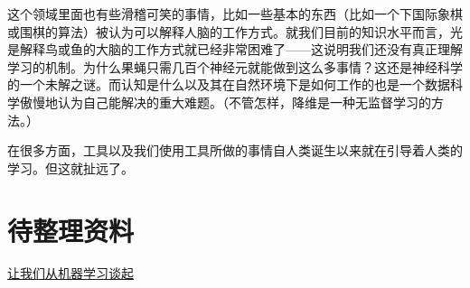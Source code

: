 \documentclass[10pt,a4paper]{ctexbook}
\begin{document}
这个领域里面也有些滑稽可笑的事情，比如一些基本的东西（比如一个下国际象棋或围棋的算法）被认为可以解释人脑的工作方式。就我们目前的知识水平而言，光是解释鸟或鱼的大脑的工作方式就已经非常困难了——这说明我们还没有真正理解学习的机制。为什么果蝇只需几百个神经元就能做到这么多事情？这还是神经科学的一个未解之谜。而认知是什么以及其在自然环境下是如何工作的也是一个数据科学傲慢地认为自己能解决的重大难题。（不管怎样，降维是一种无监督学习的方法。）

在很多方面，工具以及我们使用工具所做的事情自人类诞生以来就在引导着人类的学习。但这就扯远了。

\section{待整理资料}

\href{http://www.cnblogs.com/hellochennan/p/5423740.html}{让我们从机器学习谈起}




\ifx\mlbook\undefined
    
\end{document}

